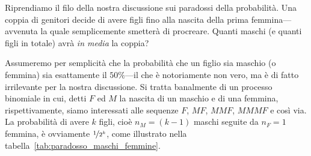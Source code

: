 Riprendiamo il filo della nostra discussione sui paradossi della probabilità.
Una coppia di genitori decide di avere figli fino alla nascita della prima
femmina---avvenuta la quale semplicemente smetterà di procreare. Quanti
maschi (e quanti figli in totale) avrà \emph{in media} la coppia?

Assumeremo per semplicità che la probabilità che un figlio sia maschio
(o femmina) sia esattamente il $50\%$---il che è notoriamente non vero, ma
è di fatto irrilevante per la nostra discussione. Si tratta banalmente di un
processo binomiale in cui, detti $F$ ed $M$ la nascita di un maschio e di una
femmina, rispettivamente, siamo interessati alle sequenze $F$, $MF$, $MMF$,
$MMMF$ e così via. La probabilità di avere $k$ figli, cioè $n_M = (k - 1)$
maschi seguite da $n_F = 1$ femmina, è ovviamente $\nicefrac{1}{2^k}$, come
illustrato nella tabella~\ref{tab:paradosso_maschi_femmine}.

\begin{table}[htbp]
\end{table}

